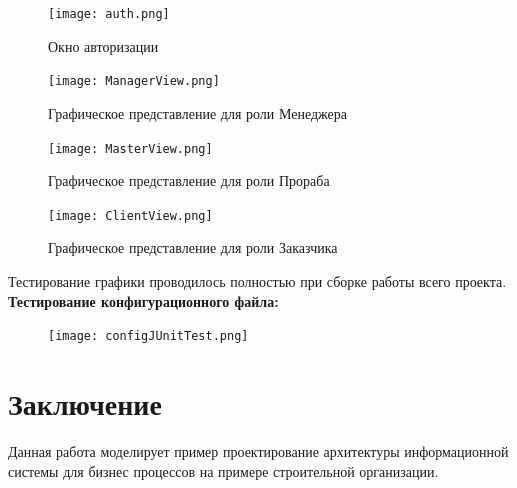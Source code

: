 \documentclass[12pt,a4paper,titlepage]{article}
\begin{document}
\begin{figure}[!ht]
\texttt{[image: auth.png]}\caption{Окно авторизации}
\end{figure}

\begin{figure}[!ht]
\texttt{[image: ManagerView.png]}\caption{Графическое представление для роли Менеджера}
\end{figure}

\begin{figure}[!ht]
\texttt{[image: MasterView.png]}\caption{Графическое представление для роли Прораба}
\end{figure}

\begin{figure}[!ht]
\texttt{[image: ClientView.png]}\caption{Графическое представление для роли Заказчика}
\end{figure}
\newpage
Тестирование графики проводилось полностью при сборке работы всего проекта.
\newpage
\textbf{Тестирование конфигурационного файла:}
\begin{figure}[!ht]
\texttt{[image: configJUnitTest.png]}\caption{}
\end{figure}
\newpage
\section{Заключение}
Данная работа моделирует пример проектирование архитектуры информационной системы для бизнес процессов на примере строительной организации.
\end{document}
